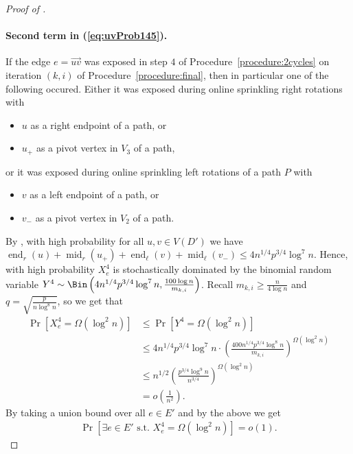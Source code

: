 \documentclass{article}
\DeclareMathOperator{\e}{end}
\DeclareMathOperator{\m}{mid}
\begin{document}
\begin{proof}[Proof of ]
		\paragraph*{Second term in (\ref{eq:uvProb145}).}
		If the edge $e=\overrightarrow{uv}$ was exposed in step $4$ of Procedure~\ref{procedure:2cycles} on iteration $(k,i)$ of Procedure~\ref{procedure:final}, then in particular one of the following occured.
		Either it was exposed during online sprinkling right rotations with
		\begin{itemize}
			\item $u$ as a right endpoint of a path, or
			\item $u_+$ as a pivot vertex in $V_3$ of a path,
		\end{itemize}
		or it was exposed during online sprinkling left rotations of a path $P$ with
		\begin{itemize}
			\item $v$ as a left endpoint of a path, or
			\item $v_-$ as a pivot vertex in $V_2$ of a path.
		\end{itemize}
		By , with high probability for all $u, v \in V(D')$ we have $\e_r(u) + \m_r(u_+) + \e_{\ell}(v) + \m_{\ell}(v_-) \le 4n^{1/4}p^{3/4}\log^7 n$.
		Hence, with high probability $X^4_e$ is stochastically dominated by the binomial random variable $Y^4 \sim \Bin\left(4n^{1/4}p^{3/4}\log^7 n, \frac{100\log n}{m_{k,i}} \right)$.
		Recall $m_{k,i} \ge \frac{n}{4\log n}$ and $q = \sqrt{\frac{p}{n\log^8 n}}$, so we get that
		\begin{align*}
		\Pr\left[X^4_e = \Omega(\log^2 n) \right] &\le \Pr\left[Y^4 = \Omega(\log^2 n) \right] \\
		&\le 4n^{1/4}p^{3/4}\log^7 n \cdot \left(\tfrac{400n^{1/4}p^{3/4}\log^8 n}{m_{k,i}} \right)^{\Omega(\log^2 n)} \\
		&\le n^{1/2} \left(\tfrac{p^{3/4}\log^9 n}{n^{3/4}} \right)^{\Omega(\log^2 n)} \\
		&= o\left(\tfrac{1}{n^2} \right).
		\end{align*}
		By taking a union bound over all $e \in E'$ and by the above we get
		\begin{align*}
		\Pr\left[\exists e\in E' \text{ s.t. } X^4_e = \Omega(\log^2 n) \right] = o(1).
		\end{align*}
		
		

\end{proof}
\end{document}
